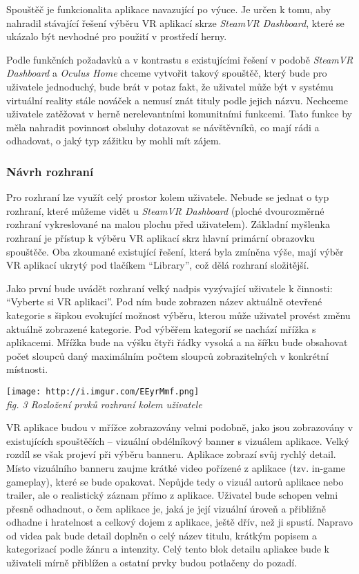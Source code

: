 Spouštěč je funkcionalita aplikace navazující po výuce. Je určen k tomu,
aby nahradil stávající řešení výběru VR aplikací skrze \emph{SteamVR
Dashboard}, které se ukázalo být nevhodné pro použití v prostředí herny.

Podle funkčních požadavků a v kontrastu s existujícími řešení v podobě
\emph{SteamVR Dashboard} a \emph{Oculus Home} chceme vytvořit takový
spouštěč, který bude pro uživatele jednoduchý, bude brát v potaz fakt,
že uživatel může být v systému virtuální reality stále nováček a nemusí
znát tituly podle jejich názvu. Nechceme uživatele zatěžovat v herně
nerelevantními komunitními funkcemi. Tato funkce by měla nahradit
povinnost obsluhy dotazovat se návštěvníků, co mají rádi a odhadovat, o
jaký typ zážitku by mohli mít zájem.

\subsubsection{Návrh rozhraní}\label{nuxe1vrh-rozhranuxed}

Pro rozhraní lze využít celý prostor kolem uživatele. Nebude se jednat o
typ rozhraní, které můžeme vidět u \emph{SteamVR Dashboard} (ploché
dvourozměrné rozhraní vykreslované na malou plochu před uživatelem).
Základní myšlenka rozhraní je přístup k výběru VR aplikací skrz hlavní
primární obrazovku spouštěče. Oba zkoumané existující řešení, která byla
zmíněna výše, mají výběr VR aplikací ukrytý pod tlačíkem ``Library'',
což dělá rozhraní složitější.

Jako první bude uvádět rozhraní velký nadpis vyzývající uživatele k
činnosti: ``Vyberte si VR aplikaci''. Pod ním bude zobrazen název
aktuálně otevřené kategorie s šipkou evokující možnost výběru, kterou
může uživatel provést změnu aktuálně zobrazené kategorie. Pod výběřem
kategorií se nachází mřížka s aplikacemi. Mřížka bude na výšku čtyři
řádky vysoká a na šířku bude obsahovat počet sloupců daný maximálním
počtem sloupců zobrazitelných v konkrétní místnosti.

\texttt{[image: http://i.imgur.com/EEyrMmf.png]}\\
\emph{fig. 3 Rozložení prvků rozhraní kolem uživatele}

VR aplikace budou v mřížce zobrazovány velmi podobně, jako jsou
zobrazovány v existujících spouštěčích -- vizuální obdélníkový banner s
vizuálem aplikace. Velký rozdíl se však projeví při výběru banneru.
Aplikace zobrazí svůj rychlý detail. Místo vizuálního banneru zaujme
krátké video pořízené z aplikace (tzv. in-game gameplay), které se bude
opakovat. Nepůjde tedy o vizuál autorů aplikace nebo trailer, ale o
realistický záznam přímo z aplikace. Uživatel bude schopen velmi přesně
odhadnout, o čem aplikace je, jaká je její vizuální úroveň a přibližně
odhadne i hratelnost a celkový dojem z aplikace, ještě dřív, než ji
spustí. Napravo od videa pak bude detail doplněn o celý název titulu,
krátkým popisem a kategorizací podle žánru a intenzity. Celý tento blok
detailu apliakce bude k uživateli mírně přiblížen a ostatní prvky budou
potlačeny do pozadí.

